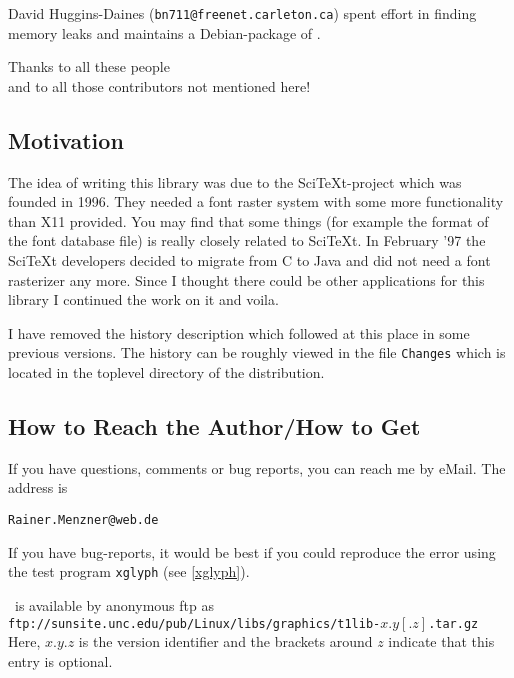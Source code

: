 David Huggins-Daines (\verb+bn711@freenet.carleton.ca+) spent effort in
finding memory leaks and maintains a Debian-package of \tonelib.


\begin{center}
  \Large Thanks to all these people \\
  and to all those contributors not mentioned here! 
\end{center}

\subsection{Motivation}
The idea of writing this library was due to the SciTeXt-project which
was founded in 1996. They needed a font raster system with some more
functionality than X11 provided. You may find that some things (for
example the format of the font database file) is really closely
related to SciTeXt. In February '{}97 the SciTeXt developers decided to
migrate from C to Java and did not need a font rasterizer any more. Since I
thought there could be other applications for this library I continued the
work on it and voila. 

I have removed the history description which followed at this place in some
previous versions. The history can be roughly viewed in the file \verb+Changes+
which is located in the toplevel directory of the distribution.


\subsection{How to Reach the Author/How to Get \tonelib}
If you have questions, comments or bug reports, you can reach me by
eMail. The address is 
\begin{center}
\verb+Rainer.Menzner@web.de+
\end{center}
If you have bug-reports, it would be best if you could reproduce the error
using the test program \verb+xglyph+ (see \ref{xglyph}). 

\tonelib\ is available by anonymous ftp as\\[5mm]
\verb+ftp://sunsite.unc.edu/pub/Linux/libs/graphics/t1lib-+$x.y[.z]$\verb+.tar.gz+
\\[5mm]
Here, $x.y.z$ is the version identifier and the brackets around $z$ indicate
that this entry is optional.

